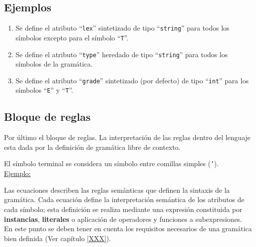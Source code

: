 \subsection*{Ejemplos}
\begin{enumerate}

\item 
\begin{center}
\end{center}
\vspace{0.2cm}
Se define el atributo ``\texttt{lex}'' sintetizado de tipo ``\texttt{string}'' para todos los símbolos excepto para el símbolo ``\texttt{T}''.

\item

\begin{center}
\end{center}
\vspace{0.2cm}
Se define el atributo ``\texttt{type}'' heredado de tipo ``\texttt{string}'' para todos los símbolos de la gramática.

\item 

\begin{center}
\end{center}
\vspace{0.2cm}
Se define el atributo ``\texttt{grade}'' sintetizado (por defecto) de tipo ``\texttt{int}'' para los símbolos ``\texttt{E}'' y ``\texttt{T}''.\\
\end{enumerate}

\subsection{Bloque de reglas}
Por último el bloque de reglas. La interpretación de las reglas dentro del lenguaje esta dada por la definición de gramática libre de contexto.          

El símbolo terminal se considera un símbolo entre comillas simples (\texttt{'}).\\ 

\underline{Ejemplo:}\ \\
\vspace{0.2cm}

Las ecuaciones describen las reglas semánticas que definen la sintaxis de la gramática. Cada ecuación define la interpretación semántica de los atributos de cada símbolo; esta definición se realiza mediante una expresión constituida por \textbf{instancias}, \textbf{literales} o aplicación de operadores y funciones a subexpresiones.
En este punto se deben tener en cuenta los requisitos necesarios de una gramática bien definida (Ver capítulo \ref{XXX}).

